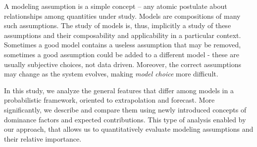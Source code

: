A modeling assumption is a simple concept -- any atomic postulate about relationships among quantities under study. Models are compositions of many such assumptions. The study of models is, thus, implicitly a study of these assumptions and their composability and applicability in a particular context. Sometimes a good model contains a useless assumption that may be removed, sometimes a good assumption could be added to a different model - these are usually subjective choices, not data driven. Moreover, the correct assumptions may change as the system evolves, making {\em model choice} more difficult.


In this study, we analyze the general features that differ among models  in a probabilistic framework, oriented to extrapolation and forecast. More significantly, we describe and compare them using newly introduced  concepts of dominance factors and expected contributions. This type of analysis enabled by our approach, that allows us to quantitatively evaluate modeling assumptions and their relative importance. 

